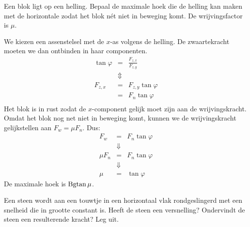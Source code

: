 \documentclass{ximera}
\begin{document}
\begin{exercise} Een blok ligt op een helling. Bepaal de maximale hoek die de
helling kan maken met de horizontale zodat het blok n\'et niet in
beweging komt. De wrijvingsfactor is $\mu$.
\begin{oplossing}
\newline
We kiezen een assenstelsel met de $x$-as volgens de helling. De
zwaartekracht moeten we dan ontbinden in haar componenten.
\begin{eqnarray*}
\tan{\varphi}&=&\frac{F_{z,x}}{F_{z,y}}\\
&\Updownarrow&\\
F_{z,x}&=&F_{z,y}\tan{\varphi}\\
&=&F_n\tan{\varphi}\\
\end{eqnarray*}
Het blok is in rust zodat de $x$-component gelijk moet zijn aan de
wrij\-vings\-kracht. Omdat het blok nog net niet in beweging komt,
kunnen we de wrijvingskracht gelijkstellen aan $F_w=\mu F_n$. Dus:
\begin{eqnarray*}
F_w&=&F_n\tan{\varphi}\\
&\Downarrow&\\
\mu F_n&=&F_n\tan{\varphi}\\
&\Downarrow&\\
\mu&=&\tan{\varphi}
\end{eqnarray*}
De maximale hoek is ${\rm Bgtan\,}\mu$.
\end{oplossing}

\end{exercise}

\begin{exercise} Een steen wordt aan een touwtje in een horizontaal vlak rondgeslingerd met een snelheid die in grootte constant is. Heeft de steen een versnelling? Ondervindt de steen een resulterende kracht? Leg uit.


\end{exercise}
\end{document}
